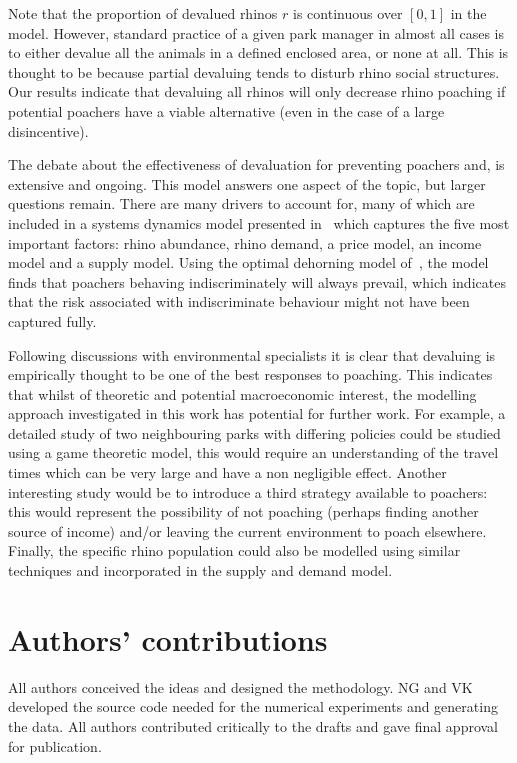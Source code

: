 \documentclass[10pt]{article}
\begin{document}
Note that the proportion of devalued rhinos \(r\) is continuous over \([0, 1]\)
in the model. However, standard practice of a given park manager in almost all
cases is to either devalue all the animals in a defined enclosed area, or none
at all. This is thought to be because partial devaluing tends to disturb
rhino social structures. Our results indicate that devaluing all rhinos will
only decrease rhino poaching if potential poachers have a viable alternative
(even in the case of a large disincentive).

The debate about the effectiveness of devaluation for preventing poachers and,
is extensive and ongoing. This model answers
one aspect of the topic, but larger questions remain. There are many drivers to
account for, many of which are included in a systems dynamics model presented
in~\cite{crookes2016trading} which captures the five most important factors:
rhino abundance, rhino demand, a price model, an income model and a supply
model. Using the optimal dehorning model of~\cite{Milner1992}, the
model~\cite{crookes2016trading} finds that poachers behaving
indiscriminately will always prevail, which indicates that the risk associated
with indiscriminate behaviour might not have been captured fully.

Following discussions with environmental specialists it is clear that devaluing
is empirically thought to be one of the best responses to poaching. This
indicates that whilst of theoretic and potential macroeconomic interest, the
modelling approach investigated in this work has potential for further work. For
example, a detailed study of two neighbouring parks with differing policies
could be studied using a game theoretic model, this would require an
understanding of the travel times which can be very large and have a non
negligible effect. Another interesting study would
be to introduce a third strategy available to poachers: this would represent the
possibility of not poaching (perhaps finding another source of income) and/or
leaving the current environment to poach elsewhere. Finally, the specific rhino
population could also be modelled using similar techniques and incorporated in
the supply and demand model.

\section*{Authors' contributions}

All authors conceived the ideas and designed the methodology. NG and VK developed the
source code needed for the numerical experiments and generating the data. All authors
contributed critically to the drafts and gave final approval for publication.
\end{document}
